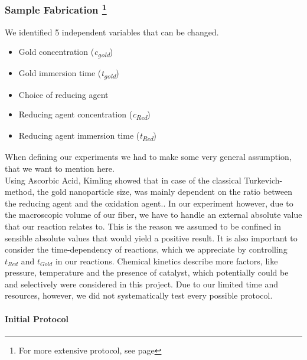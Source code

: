 \subsubsection[Sample Fabrication]{Sample Fabrication \label{subsec:SampleFab} \footnote{For more extensive protocol, see page \pageref{App:Protocols}}}


We identified 5 independent variables that can be changed.


\begin{multicols}{2}
\begin{itemize}
    \item Gold concentration (\textit{c\textsubscript{gold}})
    \item Gold immersion time (\textit{t\textsubscript{gold}})
    \item Choice of reducing agent
    \item Reducing agent concentration (\textit{c\textsubscript{Red}})
    \item Reducing agent immersion time (\textit{t\textsubscript{Red}})
\end{itemize}
\end{multicols}

When defining our experiments we had to make some very general assumption, that we want to mention here.\\
  Using Ascorbic Acid, Kimling showed that in case of the classical Turkevich-method, the gold nanoparticle size, was mainly dependent on the ratio between the reducing agent and the oxidation agent.\cite{Kimling}. In our experiment however, due to the macroscopic volume of our fiber, we have to handle an external absolute value that our reaction relates to. This is the reason we assumed to be confined in sensible absolute values that would yield a positive result. It is also important to consider the time-dependency of reactions, which we appreciate by controlling $t_{Red}$ and $t_{Gold}$ in our reactions. Chemical kinetics describe more factors, like pressure, temperature and the presence of catalyst, which potentially could be and selectively were considered in this project. Due to our limited time and resources, however, we did not systematically test every possible protocol.


\paragraph{Initial Protocol}

